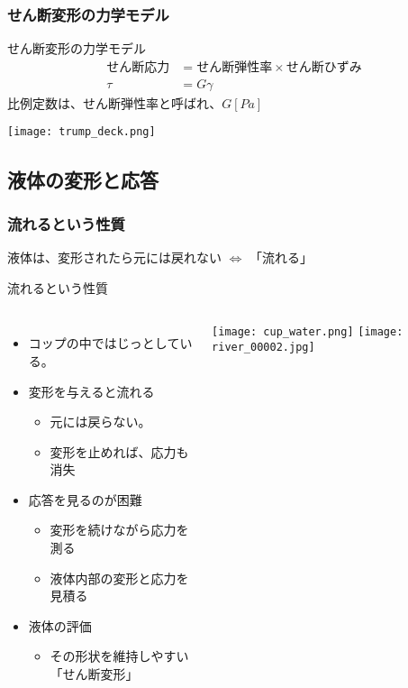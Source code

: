\documentclass[12pt, dvipdfmx]{beamer}
\begin{document}
\begin{frame}
	\frametitle{せん断変形の力学モデル}
		\begin{block}{せん断変形の力学モデル}
			\vspace{-3mm}
			\begin{align*}
				\text{せん断応力} &= \text{せん断弾性率} \times \text{せん断ひずみ} \\
				\tau &= G \gamma
			\end{align*}
			比例定数は、せん断弾性率と呼ばれ、$G[Pa]$
		\end{block}
			\begin{center}
				\texttt{[image: trump\_deck.png]}
			\end{center}
\end{frame}

\subsection{液体の変形と応答}
\begin{frame}
	\frametitle{流れるという性質}
	液体は、変形されたら元には戻れない $\Leftrightarrow$ \alert{「流れる」}
	\begin{block}{流れるという性質}
		\begin{columns}[T, onlytextwidth]
				\begin{itemize}
					\item コップの中ではじっとしている。
					\item 変形を与えると流れる
						\begin{itemize}
							\item \alert{元には戻らない。}
							\item 変形を止めれば、応力も消失
						\end{itemize}
					\item 応答を見るのが困難
						\begin{itemize}
							\item \alert{変形を続けながら応力を測る}
							\item 液体内部の変形と応力を見積る
						\end{itemize}
					\item 液体の評価
						\begin{itemize}
							\item その形状を維持しやすい\\「せん断変形」
						\end{itemize}
				\end{itemize}
				\vspace{-3mm}
				\begin{center}
					\texttt{[image: cup\_water.png]}
					\texttt{[image: river\_00002.jpg]}
				\end{center}
		\end{columns}
	\end{block}
\end{frame}
\end{document}

